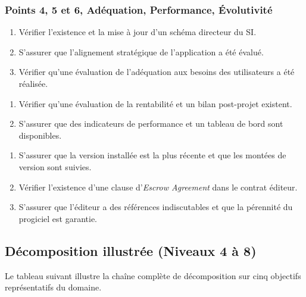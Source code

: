 \subsubsection{Points 4, 5 et 6, Adéquation, Performance, Évolutivité}

\begin{enumerate}[label=4.\arabic*.]
    \item Vérifier l'existence et la mise à jour d'un schéma directeur du SI.
    \item S'assurer que l'alignement stratégique de l'application a été évalué.
    \item Vérifier qu'une évaluation de l'adéquation aux besoins des utilisateurs a été réalisée.
\end{enumerate}
\begin{enumerate}[label=5.\arabic*.]
    \item Vérifier qu'une évaluation de la rentabilité et un bilan post-projet existent.
    \item S'assurer que des indicateurs de performance et un tableau de bord sont disponibles.
\end{enumerate}
\begin{enumerate}[label=6.\arabic*.]
    \item S'assurer que la version installée est la plus récente et que les montées de version sont suivies.
    \item Vérifier l'existence d'une clause d'\textit{Escrow Agreement} dans le contrat éditeur.
    \item S'assurer que l'éditeur a des références indiscutables et que la pérennité du progiciel est garantie.
\end{enumerate}

\subsection{Décomposition illustrée (Niveaux 4 à 8)}

Le tableau suivant illustre la chaîne complète de décomposition sur cinq objectifs représentatifs du domaine.

\setlength{\tabcolsep}{4pt}

